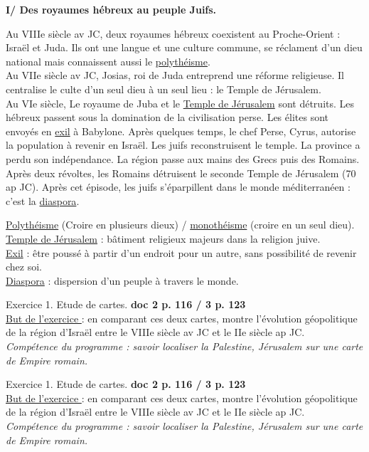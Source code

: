 \documentclass[12pt]{article}
\begin{document}
\textbf{I/ Des royaumes hébreux au peuple Juifs.}

\vspace{0.5cm}
\setlength{\parindent}{1cm} Au VIIIe siècle av JC, deux royaumes hébreux coexistent au Proche-Orient : Israël et Juda. Ils ont une langue et une culture commune, se réclament d'un dieu national mais connaissent aussi le \underline{polythéisme}.\\

\setlength{\parindent}{1cm}Au VIIe siècle av JC, Josias, roi de Juda entreprend une réforme religieuse. Il centralise le culte d'un seul dieu à un seul lieu : le Temple de Jérusalem.\\

\setlength{\parindent}{1cm}Au VIe siècle, Le royaume de Juba et le \underline{Temple de Jérusalem} sont détruits. Les hébreux passent sous la domination de la civilisation perse. Les élites sont envoyés en \underline{exil} à Babylone. Après quelques temps, le chef Perse, Cyrus, autorise la population à revenir en Israël. Les juifs reconstruisent le temple. La province a perdu son indépendance. La région passe aux mains des Grecs puis des Romains. Après deux révoltes, les Romains détruisent le seconde Temple de Jérusalem (70 ap JC). Après cet épisode, les juifs s'éparpillent dans le monde méditerranéen : c'est la \underline{diaspora}.

\vspace{0.5cm}

\underline{Polythéisme} (Croire en plusieurs dieux) / \underline{monothéisme} (croire en un seul dieu).\\
\underline{Temple de Jérusalem} : bâtiment religieux majeurs dans la religion juive.\\
\underline{Exil} : être poussé à partir d'un endroit pour un autre, sans possibilité de revenir chez soi.\\
\underline{Diaspora} : dispersion d'un peuple à travers le monde.

\newpage
{\large Exercice 1. Etude de cartes.}\textbf{ doc 2 p. 116 / 3 p. 123}\\
\underline{But de l'exercice }: en comparant ces deux cartes, montre l'évolution géopolitique de la région d’Israël entre le VIIIe siècle av JC et le IIe siècle ap JC.\\
\textit{{\small Compétence du programme : savoir localiser la Palestine, Jérusalem sur une carte de Empire romain.}}

\vfill

{\large Exercice 1. Etude de cartes.}\textbf{ doc 2 p. 116 / 3 p. 123}\\
\underline{But de l'exercice }: en comparant ces deux cartes, montre l'évolution géopolitique de la région d’Israël entre le VIIIe siècle av JC et le IIe siècle ap JC.\\
\textit{{\small Compétence du programme : savoir localiser la Palestine, Jérusalem sur une carte de Empire romain.}}
\end{document}
